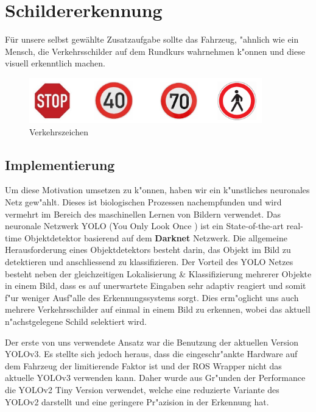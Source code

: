 \section{Schildererkennung}
\label{sec:schildererkennung}

F\"ur unsere selbst gew\"ahlte Zusatzaufgabe sollte das Fahrzeug, "ahnlich wie ein Mensch, die Verkehrsschilder auf dem Rundkurs wahrnehmen k"onnen und diese visuell erkenntlich machen.

\begin{figure}[h]
	\centering
	\includegraphics[width=0.9\textwidth]{images/Verkehrszeichen}
	\caption{Verkehrszeichen}
	\label{fig:verkehrszeichen}
\end{figure}

\subsection{Implementierung}
Um diese Motivation umsetzen zu k"onnen, haben wir ein k"unstliches neuronales Netz gew"ahlt. Dieses ist biologischen Prozessen nachempfunden und wird vermehrt im Bereich des maschinellen Lernen von Bildern verwendet. Das neuronale Netzwerk YOLO (You Only Look Once \cite{darknet13}) ist ein State-of-the-art real-time Objektdetektor
basierend auf dem \textbf{Darknet} Netzwerk.
Die allgemeine Herausforderung eines Objektdetektors besteht darin, das Objekt im Bild zu detektieren und anschliessend zu klassifizieren. Der Vorteil des YOLO Netzes besteht neben der gleichzeitigen Lokalisierung \& Klassifizierung mehrerer Objekte in einem Bild, dass es auf unerwartete Eingaben sehr adaptiv reagiert und somit f"ur weniger Ausf"alle des Erkennungssystems sorgt. Dies erm"oglicht uns auch mehrere Verkehrsschilder auf einmal in einem Bild zu erkennen, wobei das aktuell n"achstgelegene Schild selektiert wird.

Der erste von uns verwendete Ansatz war die Benutzung der aktuellen Version YOLOv3. Es stellte sich jedoch heraus, dass die eingeschr"ankte Hardware auf dem Fahrzeug der limitierende Faktor ist und der ROS Wrapper nicht das aktuelle YOLOv3 verwenden kann. Daher wurde aus Gr"unden der Performance die YOLOv2 Tiny Version verwendet, welche eine reduzierte Variante des YOLOv2 darstellt und eine geringere Pr"azision in der Erkennung hat.

